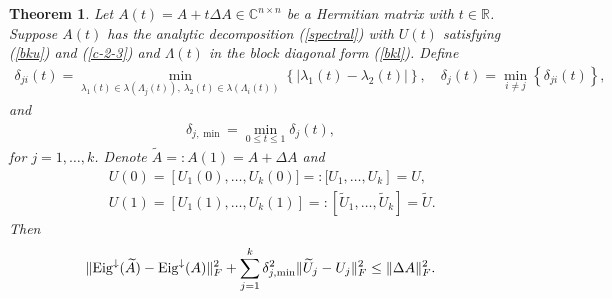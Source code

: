 \documentclass[11pt,a4paper]{article}
\numberwithin{equation}{section}
\newtheorem{Theorem}{Theorem}[section]
\newcommand {\wt} {\widetilde}
\newcommand {\diag}  {\mathop{\rm diag}\nolimits}
\begin{document}
\begin{Theorem}\label{them1}
Let $A(t)=A+t\Delta A\in\mathbb{C}^{n\times n}$ be a Hermitian matrix with $t\in{\mathbb R}$.
Suppose $A(t)$ has the analytic decomposition (\ref{spectral}) with $U(t)$ satisfying
(\ref{bku}) and (\ref{c-2-3}) and $\Lambda(t)$ in the block diagonal form (\ref{bkl}).
Define
\begin{eqnarray}\label{c-2-1}
\delta_{ji}(t)=\min_{\lambda_1(t)\in\lambda(\Lambda_j(t)),~
\lambda_2(t)\in\lambda(\Lambda_i(t))}\left\{\left|\lambda_1(t)-\lambda_2(t)\right|\right\},\quad
\delta_j(t)=\min_{i\ne j}\left\{\delta_{ji}(t)\right\},
\end{eqnarray}
and
\begin{eqnarray}\label{c-2-2}
\delta_{j,\min}=\min_{0\le t\le 1}\delta_j(t),
\end{eqnarray}
for $j=1,\ldots,k$. Denote $\wt A=: A(1)=A+\Delta A$ and
\begin{eqnarray*}
&&U(0)=\left[U_1(0),\ldots, U_k(0)]=:[U_1, \ldots, U_k\right]=U,\\
&&U(1)=\left[U_1(1),\ldots, U_k(1)\right]=:[\wt U_1,\ldots, \wt U_k ]=\wt U. %
\end{eqnarray*}
Then
\begin{eqnarray}\label{c-2-4}
\|{\rm Eig}^{\downarrow}(\wt A)-{\rm Eig}^{\downarrow}(A)\|_F^2+\sum_{j=1}^k
\delta_{j,\min}^2\|\wt U_j-U_j\|_F^2\le
\|{\Delta A}\|_F^2.
\end{eqnarray}
\end{Theorem}\vskip 2mm
\end{document}
